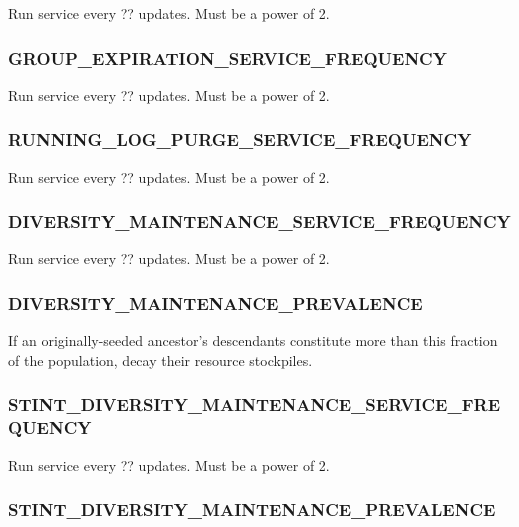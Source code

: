 
Run service every ?? updates.
Must be a power of 2.

\subsubsection{GROUP\_EXPIRATION\_SERVICE\_FREQUENCY}


Run service every ?? updates.
Must be a power of 2.

\subsubsection{RUNNING\_LOG\_PURGE\_SERVICE\_FREQUENCY}


Run service every ?? updates.
Must be a power of 2.

\subsubsection{DIVERSITY\_MAINTENANCE\_SERVICE\_FREQUENCY}


Run service every ?? updates.
Must be a power of 2.

\subsubsection{DIVERSITY\_MAINTENANCE\_PREVALENCE}


If an originally-seeded ancestor's descendants constitute more than this fraction of the population, decay their resource stockpiles.

\subsubsection{STINT\_DIVERSITY\_MAINTENANCE\_SERVICE\_FREQUENCY}


Run service every ?? updates.
Must be a power of 2.

\subsubsection{STINT\_DIVERSITY\_MAINTENANCE\_PREVALENCE}


